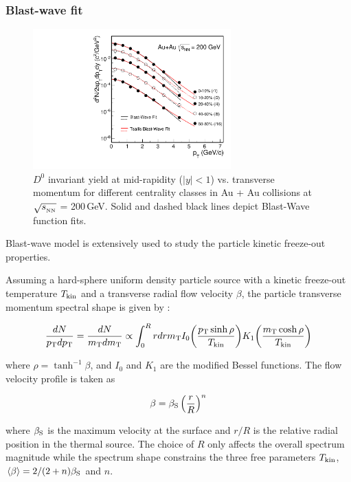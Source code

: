 \subsubsection{\label{result:collectivity:BW}Blast-wave fit}

\begin{figure}
\centering
\includegraphics[width=0.68\textwidth]{figure/Run14_D0HFT/BWFit.pdf}
\caption{$D^{0}$ invariant yield at mid-rapidity ($|y|<1$) vs. transverse momentum for different centrality classes in Au + Au collisions at $\sqrt{s_{_{\rm NN}}}$ = 200\,GeV. Solid and dashed black lines depict Blast-Wave function fits.}
\label{Teff_ALL} 
\end{figure}


Blast-wave model is extensively used to study the particle kinetic freeze-out properties. 

Assuming a hard-sphere uniform density particle source with a kinetic freeze-out temperature $T_{\rm kin}$ and a transverse radial flow velocity $\beta$, the particle transverse momentum spectral shape is given by :

\begin{equation}
\frac{dN}{p_{\rm T}dp_{\rm T}} = \frac{dN}{m_{\rm T}dm_{\rm T}} \propto \int_0^R rdr m_{\rm T} I_0\bigg(\frac{p_{\rm T}\sinh\rho}{T_{\rm kin}}\bigg) K_1\bigg(\frac{m_{\rm T}\cosh\rho}{T_{\rm kin}}\bigg)
\end{equation}

where $\rho = \tanh^{-1}\beta$, and $I_0$ and $K_1$ are the modified Bessel functions. The flow velocity profile is taken as

\begin{equation}
\beta = \beta_{\rm S}\left(\frac{r}{R}\right)^{n}
\end{equation}

where $\beta_{\rm S}$ is the maximum velocity at the surface and $r/R$ is the relative radial position in the thermal source. The choice of $R$ only affects the overall spectrum magnitude while the spectrum shape constrains the three free parameters $T_{\rm kin}$, $\langle\beta\rangle=2/(2+n)\beta_{\rm S}$ and $n$.


